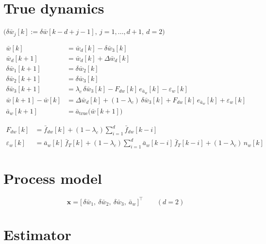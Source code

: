 \documentclass[11pt,a4paper,fontset=none]{ctexart}
\newcommand{\ba}{\bar{a}}
\newcommand{\bw}{\bar{w}}
\begin{document}
\section{True dynamics}

$\bigl(\delta\bw_j[k] := \delta\bw[k-d+j-1],\ j = 1,\dots,d+1,\ d = 2\bigr)$

\begin{align*}
\bw[k]           &= \bw_d[k] - \delta\bw_3[k] \\
\bw_d[k+1]       &= \bw_d[k] + \Delta\bw_d[k] \\
\delta\bw_1[k+1] &= \delta\bw_2[k] \\
\delta\bw_2[k+1] &= \delta\bw_3[k] \\
\delta\bw_3[k+1] &= \lambda_c\,\delta\bw_3[k] - F_{dw}[k]\,e_{\ba_w}[k] - \varepsilon_w[k] \\
\bw[k+1] - \bw[k] &= \Delta\bw_d[k] + (1-\lambda_c)\,\delta\bw_3[k] + F_{dw}[k]\,e_{\ba_w}[k] + \varepsilon_w[k] \\
\ba_w[k+1]       &= \ba_{\mathrm{true}}\bigl(\bw[k+1]\bigr)
\end{align*}

\begin{align*}
F_{dw}[k] &= \bar{f}_{dw}[k] + (1-\lambda_c)\sum_{i=1}^{d}\bar{f}_{dw}[k-i] \\
\varepsilon_w[k] &= \ba_w[k]\,\bar{f}_T[k]
  + (1-\lambda_c)\sum_{i=1}^{d}\ba_w[k-i]\,\bar{f}_T[k-i]
  + (1-\lambda_c)\,n_w[k]
\end{align*}

\section{Process model}

\begin{equation*}
\mathbf{x} = \bigl[\,\delta\bw_1,\ \delta\bw_2,\ \delta\bw_3,\ \ba_w\,\bigr]^{\top}
\qquad (d = 2)
\end{equation*}

\section{Estimator}
\end{document}
